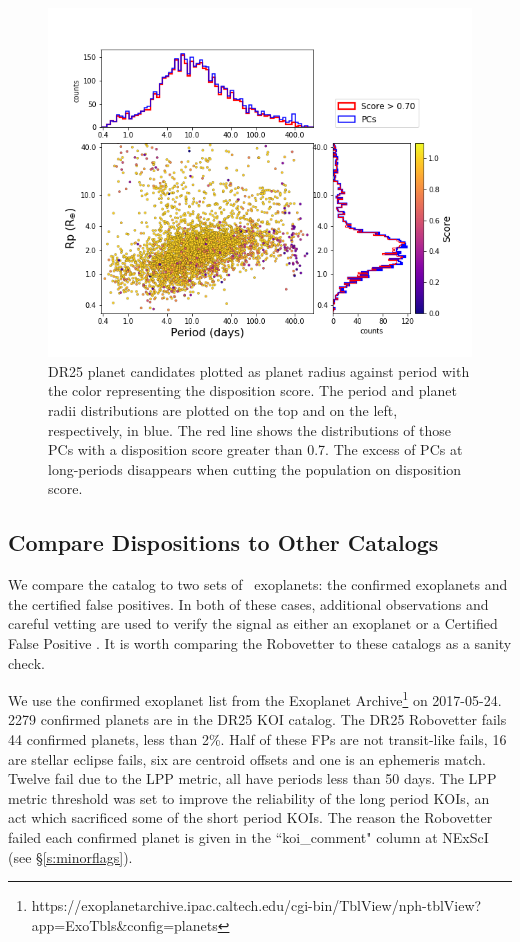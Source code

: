 \begin{figure}[ht]
    \centering
    \includegraphics[width=1.1\linewidth]{fig-radiusPeriodScore-hist.png}
    \caption{DR25 planet candidates plotted as planet radius against period with the color representing the disposition score. The period and planet radii distributions are plotted on the top and on the left, respectively, in blue. The red line shows the distributions of those PCs with a disposition score greater than 0.7. The excess of PCs at long-periods disappears when cutting the population on disposition score. }
    \label{f:catalogPlot}
\end{figure}

\subsection{Compare Dispositions to Other Catalogs}
We compare the catalog to two sets of \Kepler\ exoplanets: the confirmed exoplanets and the certified false positives.  In both of these cases, additional observations and careful vetting are used to verify the signal as either an exoplanet or a Certified False Positive \citep{Bryson2017c}. It is worth comparing the Robovetter to these catalogs as a sanity check.  

We use the confirmed exoplanet list from the Exoplanet Archive\footnote{https://exoplanetarchive.ipac.caltech.edu/cgi-bin/TblView/nph-tblView?app=ExoTbls\&config=planets} on 2017-05-24.  2279 confirmed planets are in the DR25 KOI catalog.  The DR25 Robovetter fails 44 confirmed planets, less than 2\%. Half of these FPs are not transit-like fails, 16 are stellar eclipse fails, six are centroid offsets and one is an ephemeris match. Twelve fail due to the LPP metric, all have periods less than 50 days.  The LPP metric threshold was set to improve the reliability of the long period KOIs, an act which sacrificed some of the short period KOIs.  The reason the Robovetter failed each confirmed planet is given in the ``koi\_comment" column at NExScI (see \S\ref{s:minorflags}). 

